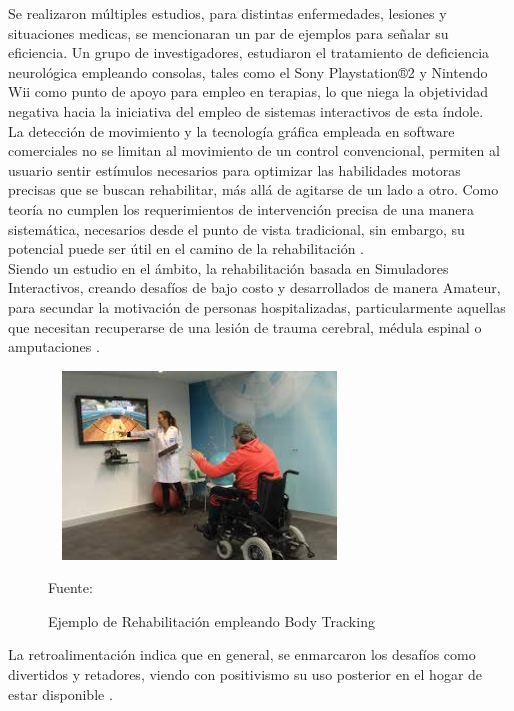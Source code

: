 Se realizaron múltiples estudios, para distintas enfermedades, lesiones y situaciones medicas, se mencionaran un par de ejemplos para señalar su eficiencia. Un grupo de investigadores, estudiaron el tratamiento de deficiencia neurológica empleando consolas, tales como el Sony Playstation®2 \cite{rand2008sony} y Nintendo Wii \cite{herz2013nintendo} como punto de apoyo para empleo en terapias, lo que niega la objetividad negativa hacia la iniciativa del empleo de sistemas interactivos de esta índole.\\

La detección de movimiento y la tecnología gráfica empleada en software comerciales no se limitan al movimiento de un control convencional, permiten al usuario sentir estímulos necesarios para optimizar las habilidades motoras precisas que se buscan rehabilitar, más allá de agitarse de un lado a otro. Como teoría no cumplen los requerimientos de intervención precisa de una manera sistemática, necesarios desde el punto de vista tradicional, sin embargo, su potencial puede ser útil en el camino de la rehabilitación \cite{lange2011markerless}. \\

Siendo un estudio en el ámbito, la rehabilitación basada en Simuladores Interactivos, creando desafíos de bajo costo y desarrollados de manera Amateur, para secundar la motivación de personas hospitalizadas, particularmente aquellas que necesitan recuperarse de una lesión de trauma cerebral, médula espinal o amputaciones \cite{lange2011markerless}. 
\begin{figure}[t!]
	\centering
	\includegraphics[width=8cm,height=5cm,]{./Images/rehabilitacionexample.jpg}
	\caption{Ejemplo de Rehabilitación empleando Body Tracking}
	\footnotesize Fuente: \cite{rehabilitacionexample}
	\label{rehabexample}
\end{figure}
La retroalimentación indica que en general, se enmarcaron los desafíos como divertidos y retadores, viendo con positivismo su uso posterior en el hogar de estar disponible \cite{lange2011leveraging}.\\

